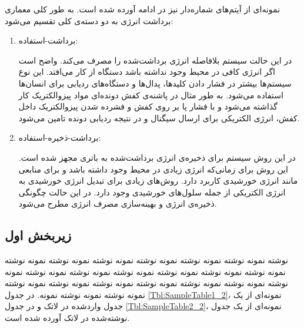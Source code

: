 نمونه‌ای از آیتم‌های شماره‌دار نیز در ادامه آورده شده است. به طور کلی معماری برداشت انرژی به دو دسته‌ی کلی تقسیم می‌شود:
\begin{enumerate}[label=\arabic*)]
\item
برداشت-استفاده:

در این حالت سیستم بلافاصله انرژی برداشت‌شده را مصرف می‌کند. واضح است اگر انرژی کافی در محیط وجود نداشته باشد دستگاه از کار می‌افتد. این نوع سیستم‌ها بیشتر در فشار دادن کلید‌ها، پدال‌ها و دستگاه‌های ردیابی برای انسان‌ها استفاده می‌شود. به طور مثال در پاشنه‌ی کفش دونده‌ای مواد پیزوالکتریک کار گذاشته می‌شود و با فشار پا بر روی کفش و فشرده شدن پیزوالکتریک داخل کفش، انرژی الکتریکی برای ارسال سیگنال 
و در نتیجه ردیابی دونده تامین می‌شود. 
\item
برداشت-ذخیره-استفاده:

در این روش سیستم برای ذخیره‌ی انرژی برداشت‌شده به باتری مجهز شده است. این روش برای زمانی‌که انرژی زیادی در محیط وجود داشته باشد و برای منابعی مانند انرژی خورشیدی  کاربرد دارد. روش‌های زیادی برای تبدیل انرژی خورشیدی به انرژی الکتریکی از جمله سلول‌های خورشیدی وجود دارد. در این حالت چگونگی ذخیره‌ی انرژی و بهینه‌سازی مصرف انرژی مطرح می‌شود.
\end{enumerate}




\subsection{زیربخش اول}
نوشته نمونه نوشته نمونه نوشته نمونه نوشته نمونه نوشته نمونه نوشته نمونه نوشته نمونه نوشته نمونه نوشته نمونه نوشته نمونه نوشته نمونه نوشته نمونه نوشته نمونه نوشته نمونه نوشته نمونه نوشته نمونه نوشته نمونه نوشته نمونه نوشته نمونه نوشته نمونه نوشته نمونه نوشته نمونه. در جدول
\ref{Tbl:SampleTable1_2}،
نمونه‌ای از یک جدول واردشده در لاتک و در جدول
\ref{Tbl:SampleTable2_2}،
نمونه‌ای از یک جدول نوشته‌شده در لاتک آورده شده است.

